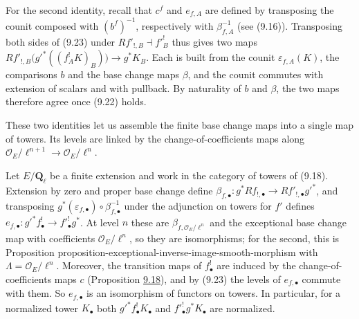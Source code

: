 \documentclass[11pt]{article}
\begin{document}
For the second identity, recall that \(c^f\) and \(e_{f,A}\) are defined by transposing the counit composed with \((b^f)^{-1}\), respectively with \(\beta_{f,A}^{-1}\) (see (9.16)). Transposing both sides of (9.23) under \(Rf'_{!,B}\dashv f'^!_B\) thus gives two maps \(Rf'_{!,B}\bigl(g'^*((f_A^!K)_B)\bigr)\to g^*K_B\). Each is built from the counit \(\varepsilon_{f,A}(K)\), the comparisons \(b\) and the base change maps \(\beta\), and the counit commutes with extension of scalars and with pullback. By naturality of \(b\) and \(\beta\), the two maps therefore agree once (9.22) holds.

These two identities let us assemble the finite base change maps into a single map of towers. Its levels are linked by the change-of-coefficients maps along \(\mathcal O_E/\ell^{n+1}\to\mathcal O_E/\ell^n\).

Let \(E/\mathbf Q_\ell\) be a finite extension and work in the category of towers of (9.18). Extension by zero and proper base change define \(\beta_{f,\bullet}:g^*Rf_{!,\bullet}\to Rf'_{!,\bullet}g'^*\), and transposing \(g^*(\varepsilon_{f,\bullet})\circ\beta_{f,\bullet}^{-1}\) under the adjunction on towers for \(f'\) defines \(e_{f,\bullet}:g'^*f_\bullet^!\to f'^!_\bullet g^*\). At level \(n\) these are \(\beta_{f,\mathcal O_E/\ell^n}\) and the exceptional base change map with coefficients \(\mathcal O_E/\ell^n\), so they are isomorphisms; for the second, this is Proposition proposition-exceptional-inverse-image-smooth-morphism with \(\Lambda=\mathcal O_E/\ell^n\). Moreover, the transition maps of \(f_\bullet^!\) are induced by the change-of-coefficients maps \(c\) (Proposition \hyperref[bp58]{9.18}), and by (9.23) the levels of \(e_{f,\bullet}\) commute with them. So \(e_{f,\bullet}\) is an isomorphism of functors on towers. In particular, for a normalized tower \(K_\bullet\) both \(g'^*f_\bullet^!K_\bullet\) and \(f'^!_\bullet g^*K_\bullet\) are normalized.
\end{document}
